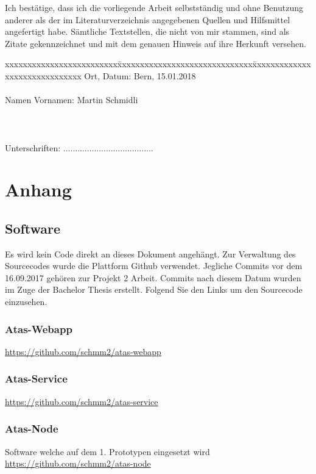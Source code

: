 \documentclass[11pt,english,german]{report}
\theoremstyle{definition}
\begin{document}
\vspace*{10mm} 

Ich bestätige, dass ich die vorliegende Arbeit selbstständig und ohne Benutzung anderer als der im Literaturverzeichnis angegebenen Quellen und Hilfsmittel angefertigt habe. Sämtliche Textstellen, die nicht von mir stammen, sind als Zitate gekennzeichnet und mit dem genauen Hinweis auf ihre Herkunft versehen. 

\vspace{15mm}

\begin{tabbing}
xxxxxxxxxxxxxxxxxxxxxxxxx\=xxxxxxxxxxxxxxxxxxxxxxxxxxxxxx\=xxxxxxxxxxxxxxxxxxxxxxxxxxxxxx\kill
Ort, Datum:\> Bern, 15.01.2018 \\ \\
Namen Vornamen:\> Martin Schmidli  \\ \\ \\ \\ 
Unterschriften:\> ...................................... \\
\end{tabbing}

\chapter*{Anhang}
\section{Software}
Es wird kein Code direkt an dieses Dokument angehängt. Zur Verwaltung des Sourcecodes wurde die Plattform Github verwendet. Jegliche Commits vor dem 16.09.2017 gehören zur Projekt 2 Arbeit. Commits nach diesem Datum wurden im Zuge der Bachelor Thesis erstellt. 
Folgend Sie den Links um den Sourcecode einzusehen.
\subsection{Atas-Webapp}
\url{https://github.com/schmm2/atas-webapp}
\subsection{Atas-Service}
\url{https://github.com/schmm2/atas-service}
\subsection{Atas-Node}
Software welche auf dem 1. Prototypen eingesetzt wird\\
\url{https://github.com/schmm2/atas-node}
\end{document}
